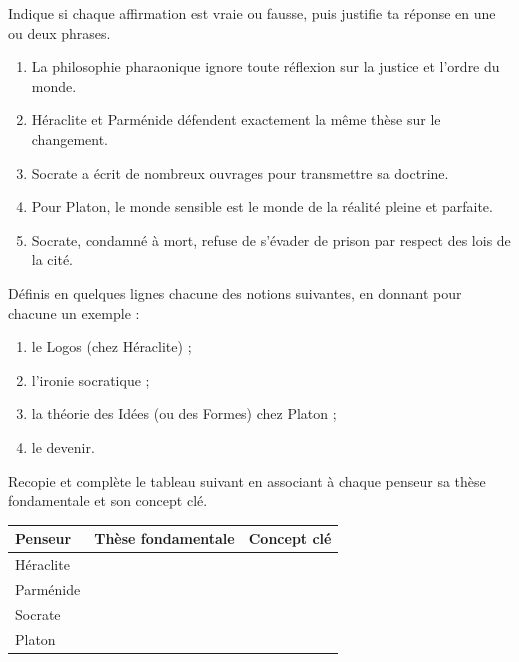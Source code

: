 \documentclass[11pt]{article}
\newcommand{\cle}[1]{{\popxbold\color{popdark}#1}}
\begin{document}
\begin{exercice}
Indique si chaque affirmation est vraie ou fausse, puis justifie ta réponse en une ou deux phrases.
\begin{enumerate}
\item La philosophie pharaonique ignore toute réflexion sur la justice et l'ordre du monde.
\item Héraclite et Parménide défendent exactement la même thèse sur le changement.
\item Socrate a écrit de nombreux ouvrages pour transmettre sa doctrine.
\item Pour Platon, le monde sensible est le monde de la réalité pleine et parfaite.
\item Socrate, condamné à mort, refuse de s'évader de prison par respect des lois de la cité.
\end{enumerate}
\end{exercice}

\begin{exercice}[Définitions]
Définis en quelques lignes chacune des notions suivantes, en donnant pour chacune un exemple :
\begin{enumerate}
\item le \cle{Logos} (chez Héraclite) ;
\item l'\cle{ironie} socratique ;
\item la théorie des \cle{Idées} (ou des Formes) chez Platon ;
\item le \cle{devenir}.
\end{enumerate}
\end{exercice}

\begin{exercice}
Recopie et complète le tableau suivant en associant à chaque penseur sa thèse fondamentale et son concept clé.
\begin{center}
\begin{tabularx}{\linewidth}{|l|X|X|}
\hline
\rowcolor{popblueL} \textbf{Penseur} & \textbf{Thèse fondamentale} & \textbf{Concept clé} \\
\hline
Héraclite & & \\
\hline
Parménide & & \\
\hline
Socrate & & \\
\hline
Platon & & \\
\hline
\end{tabularx}
\end{center}
\end{exercice}
\end{document}
